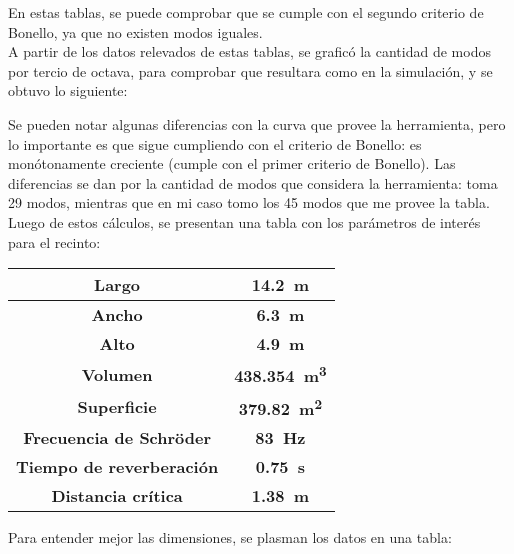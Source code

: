 En estas tablas, se puede comprobar que se cumple con el segundo criterio de Bonello, ya que no existen modos iguales.\\

A partir de los datos relevados de estas tablas, se graficó la cantidad de modos por tercio de octava, para comprobar que resultara como en la simulación, y se obtuvo lo siguiente:


Se pueden notar algunas diferencias con la curva que provee la herramienta, pero lo importante es que sigue cumpliendo con el criterio de Bonello: es monótonamente creciente (cumple con el primer criterio de Bonello). Las diferencias se dan por la cantidad de modos que considera la herramienta: toma 29 modos, mientras que en mi caso tomo los 45 modos que me provee la tabla.\\

Luego de estos cálculos, se presentan una tabla con los parámetros de interés para el recinto:

		\begin{table}[h!]
			\centering
			\begin{tabular}{cc}
			\toprule
			\textbf{Largo} & \textbf{\SI{14.2}{\m}}\\
			\midrule
			\textbf{Ancho} & \textbf{\SI{6.3}{\m}}\\
			\midrule
			\textbf{Alto} & \textbf{\SI{4.9}{\m}}\\
			\midrule
			\textbf{Volumen} & \textbf{\SI{438.354}{\cubic\m}}\\
			\midrule
			\textbf{Superficie} & \textbf{\SI{379.82}{\square\m}}\\
			\midrule
			\textbf{Frecuencia de Schröder} & \textbf{\SI{83}{\Hz}}\\
			\midrule
			\textbf{Tiempo de reverberación} & \textbf{\SI{0.75}{\s}}\\
			\midrule
			\textbf{Distancia crítica} & \textbf{\SI{1.38}{\m}}\\
			\bottomrule
			\end{tabular}
		\end{table}

Para entender mejor las dimensiones, se plasman los datos en una tabla:

